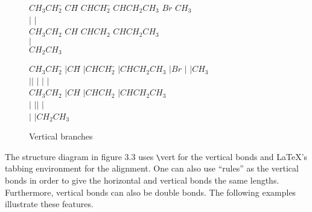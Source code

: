  \begin{figure}
  \hspace{1cm}
  \begin{minipage}{180pt}
  \begin{tabbing}
   $CH_{3}CH_{2}$\= $CH$\= $CHCH_{2}$\= $CHCH_{2}CH_{3}$\+ \kill
                    $Br$\>           \> $CH_{3}$       \\ [-10pt]
    \hspace{2pt}$\vert $\>           \> \hspace{2pt}$\vert $ \- \\ [-9pt]
   $CH_{3}CH_{2}$\> $CH$\> $CHCH_{2}$\> $CHCH_{2}CH_{3}$\+ \+ \\ [-9pt]
     \hspace{2pt}   $\vert $                                  \\ [-9pt]
                    $CH_{2}CH_{3}$
  \end{tabbing}
  \end{minipage}
  \hspace{2.5cm}
 \begin{minipage}{180pt}         
  \begin{tabbing}
   $CH_{3}CH_{2}$\= $\vert CH$\= $\vert CHCH_{2}$\= $\vert CHCH_{2}CH_{3}$
                                                     \+ \kill
                    $\vert Br$\> $\vert $        \> $\vert CH_{3}$
                                                    \\ [-10pt]
   $\vert $\hspace{2pt}$\vert $\> $\vert $       \> $\vert $\hspace{2pt}
                                                    $\vert $ \- \\ [-9pt]
   $CH_{3}CH_{2}$\> $\vert CH$ \> $\vert CHCH_{2}$\> $\vert CHCH_{2}CH_{3}$
                                                    \+ \\ [-9pt]
         $\vert $\> $\vert $\hspace{2pt}$\vert $  \> $\vert $
                                                    \\ [-9pt]
         $\vert $\> $\vert CH_{2}CH_{3}$
   \end{tabbing}
   \end{minipage}
   \caption{Vertical branches}
  \end{figure}

 The structure diagram in figure 3.3 uses \verb+\+vert for the vertical
 bonds and LaTeX's tabbing environment for the alignment. One can also
 use ``rules'' as the vertical bonds in order to give the horizontal
 and vertical bonds the same lengths. Furthermore, vertical bonds can
 also be double bonds. The following examples illustrate these features.

